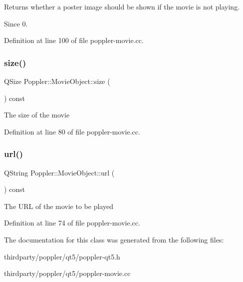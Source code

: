 Returns whether a poster image should be shown if the movie is not playing. \begin{DoxySince}{Since}
0. 
\end{DoxySince}


Definition at line 100 of file poppler-\/movie.\+cc.

\mbox{\label{class_poppler_1_1_movie_object_a963410e08dcf8a836dce6344570b082d}} 
\subsubsection{\texorpdfstring{size()}{size()}}
{\footnotesize\ttfamily Q\+Size Poppler\+::\+Movie\+Object\+::size (\begin{DoxyParamCaption}{ }\end{DoxyParamCaption}) const}

The size of the movie 

Definition at line 80 of file poppler-\/movie.\+cc.

\mbox{\label{class_poppler_1_1_movie_object_a17efdfb3bec8e27f497e779c765e1ee8}} 
\subsubsection{\texorpdfstring{url()}{url()}}
{\footnotesize\ttfamily Q\+String Poppler\+::\+Movie\+Object\+::url (\begin{DoxyParamCaption}{ }\end{DoxyParamCaption}) const}

The U\+RL of the movie to be played 

Definition at line 74 of file poppler-\/movie.\+cc.



The documentation for this class was generated from the following files\+:\begin{DoxyCompactItemize}
\item 
thirdparty/poppler/qt5/poppler-\/qt5.\+h\item 
thirdparty/poppler/qt5/poppler-\/movie.\+cc\end{DoxyCompactItemize}
